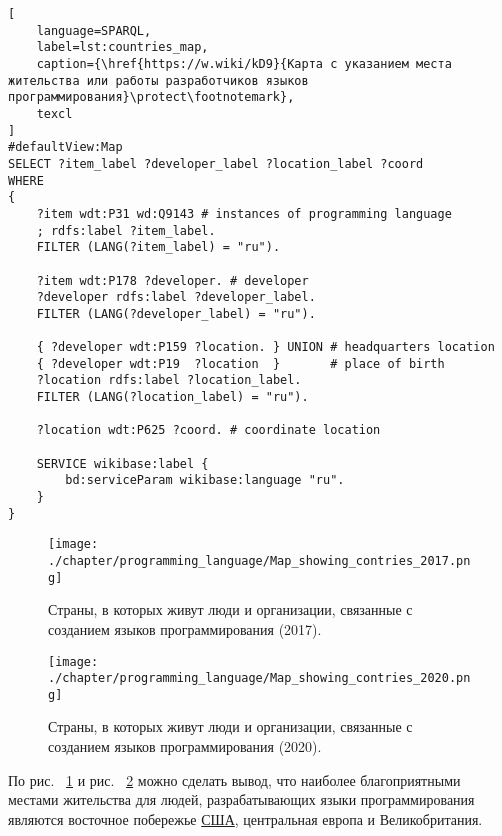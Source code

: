 \begin{lstlisting}[
	language=SPARQL,
	label=lst:countries_map,
	caption={\href{https://w.wiki/kD9}{Карта с указанием места жительства или работы разработчиков языков программирования}\protect\footnotemark},
	texcl
]
#defaultView:Map
SELECT ?item_label ?developer_label ?location_label ?coord
WHERE
{
    ?item wdt:P31 wd:Q9143 # instances of programming language
    ; rdfs:label ?item_label.     
    FILTER (LANG(?item_label) = "ru"). 
  
    ?item wdt:P178 ?developer. # developer
    ?developer rdfs:label ?developer_label. 
    FILTER (LANG(?developer_label) = "ru"). 
      		
    { ?developer wdt:P159 ?location. } UNION # headquarters location
    { ?developer wdt:P19  ?location  }       # place of birth
    ?location rdfs:label ?location_label. 
    FILTER (LANG(?location_label) = "ru").
    
    ?location wdt:P625 ?coord. # coordinate location

    SERVICE wikibase:label {
        bd:serviceParam wikibase:language "ru".
    }   	
}
\end{lstlisting}

\begin{figure}[h]
\centering
	\texttt{[image: ./chapter/programming\_language/Map\_showing\_contries\_2017.png]}
	\caption{Страны, в которых живут люди и организации, связанные с созданием языков программирования (2017).}
	\label{fig:countries_2017}
\end{figure}
\begin{figure}
\centering
	\texttt{[image: ./chapter/programming\_language/Map\_showing\_contries\_2020.png]}
	\caption{Страны, в которых живут люди и организации, связанные с созданием языков программирования (2020).}
	\label{fig:countries_2020}
\end{figure}

\pagebreak

\begin{marginfigure}
{
\setlength{\fboxsep}{0pt}%
\setlength{\fboxrule}{1pt}%
}
  \caption{Наиболее благоприятные страны для появления людей, способных к разработке языков программирования на 2020 год.}%
  \label{fig:countries_2_2020}%
\end{marginfigure}
По  рис. ~\ref{fig:countries_2017} и рис. ~\ref{fig:countries_2020} можно сделать вывод, что наиболее благоприятными местами жительства для людей, разрабатывающих языки программирования являются восточное побережье \href{https://en.wikipedia.org/wiki/USA}{США}, центральная европа и Великобритания.

